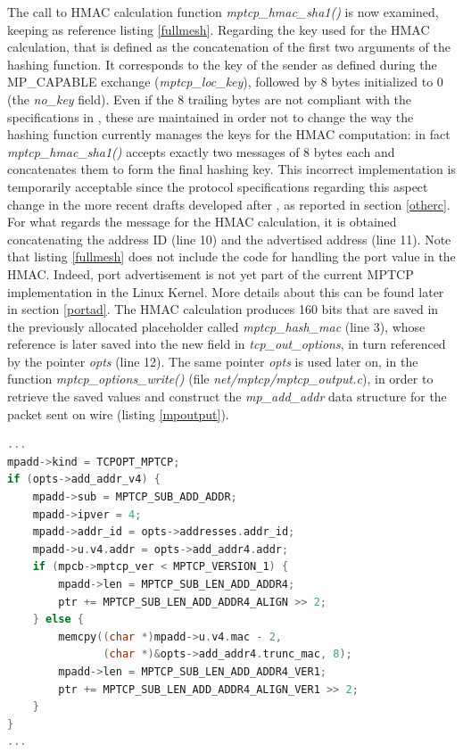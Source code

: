 The call to HMAC calculation function \textit{mptcp\_hmac\_sha1()} is now examined, keeping as reference listing \ref{fullmesh}. Regarding the key used for the HMAC calculation, that is defined as the concatenation of the first two arguments of the hashing function. It corresponds to the key of the sender as defined during the MP\_CAPABLE exchange (\textit{mptcp\_loc\_key}), followed by 8 bytes initialized to 0 (the \textit{no\_key} field). Even if the 8 trailing bytes are not compliant with the specifications in , these are maintained in order not to change the way the hashing function currently manages the keys for the HMAC computation: in fact \textit{mptcp\_hmac\_sha1()} accepts exactly two messages of 8 bytes each and concatenates them to form the final hashing key. This incorrect implementation is temporarily acceptable since the protocol specifications regarding this aspect change in the more recent drafts developed after , as reported in section \ref{otherc}.
For what regards the message for the HMAC calculation, it is obtained concatenating the address ID (line 10) and the advertised address (line 11). Note that listing \ref{fullmesh} does not include the code for handling the port value in the HMAC. Indeed, port advertisement is not yet part of the current MPTCP implementation in the Linux Kernel. More details about this can be found later in section \ref{portad}. 
The HMAC calculation produces 160 bits that are saved in the previously allocated placeholder called \textit{mptcp\_hash\_mac} (line 3), whose reference is later saved into the new field in \textit{tcp\_out\_options}, in turn referenced by the pointer \textit{opts} (line 12). The same pointer \textit{opts} is used later on, in the function \textit{mptcp\_options\_write()} (file \textit{net/mptcp/mptcp\_output.c}), in order to retrieve the saved values and construct the \textit{mp\_add\_addr} data structure for the packet sent on wire (listing \ref{mpoutput}).

\begin{lstlisting}[language=c, caption=\textit{Building ADD\_ADDR2 output message}, label=mpoutput]
...
mpadd->kind = TCPOPT_MPTCP;
if (opts->add_addr_v4) {
	mpadd->sub = MPTCP_SUB_ADD_ADDR;
	mpadd->ipver = 4;
	mpadd->addr_id = opts->addresses.addr_id;
	mpadd->u.v4.addr = opts->add_addr4.addr;
	if (mpcb->mptcp_ver < MPTCP_VERSION_1) {
		mpadd->len = MPTCP_SUB_LEN_ADD_ADDR4;
		ptr += MPTCP_SUB_LEN_ADD_ADDR4_ALIGN >> 2;
	} else {
		memcpy((char *)mpadd->u.v4.mac - 2,
	           (char *)&opts->add_addr4.trunc_mac, 8);
		mpadd->len = MPTCP_SUB_LEN_ADD_ADDR4_VER1;
		ptr += MPTCP_SUB_LEN_ADD_ADDR4_ALIGN_VER1 >> 2;
	}
}
...
\end{lstlisting}


